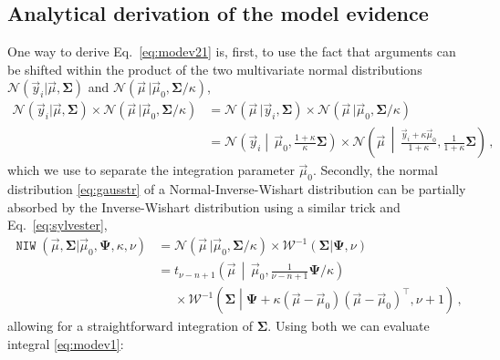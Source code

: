 \documentclass{article}
\begin{document}
\subsection{Analytical derivation of the model evidence}
\label{sec:appendix_derivmodev}
One way to derive Eq.~\eqref{eq:modev21} is, first, to use the fact that arguments can be shifted within the product of the two multivariate normal distributions $\mathcal{N}(\vec{y}_i | \vec{\mu}, \bm{\Sigma})$ and $\mathcal{N}(\vec{\mu}\, | \vec{\mu}_0, \bm{\Sigma} / \kappa)$,
\begin{align}
    \mathcal{N}(\vec{y}_i | \vec{\mu}, \bm{\Sigma}) \times \mathcal{N}(\vec{\mu}\, | \vec{\mu}_0, \bm{\Sigma} / \kappa)
    &= \mathcal{N}(\vec{\mu}\, | \vec{y}_i, \bm{\Sigma}) \times \mathcal{N}(\vec{\mu}\, | \vec{\mu}_0, \bm{\Sigma} / \kappa) \nonumber \\
    &= \mathcal{N}\! \left(\vec{y}_i \middle|\, \vec{\mu}_0, \frac{1 + \kappa}{\kappa} \bm{\Sigma} \right) \times \mathcal{N}\! \left(\vec{\mu} \,\middle|\, \frac{\vec{y}_i + \kappa \vec{\mu}_0}{1 + \kappa}, \frac{1}{1 + \kappa} \bm{\Sigma} \right) \,, \label{eq:trick1}
\end{align}
which we use to separate the integration parameter $\vec{\mu}_0$.
Secondly, the normal distribution \eqref{eq:gausstr} of a Normal-Inverse-Wishart distribution can be partially absorbed by the Inverse-Wishart distribution using a similar trick and Eq.~\eqref{eq:sylvester},
\begin{align}
    \operatorname{\texttt{NIW}} (\vec{\mu}, \bm{\Sigma} | \vec{\mu}_0, \bm{\Psi}, \kappa, \nu)
    &= \mathcal{N}(\vec{\mu}\, | \vec{\mu}_0, \bm{\Sigma} / \kappa) \times \mathcal{W}^{-1}(\bm{\Sigma} | \bm{\Psi}, \nu) \nonumber \\
    &= t_{\nu - n + 1}\!\left(\vec{\mu} \, \middle| \, \vec{\mu}_0, \frac{1}{\nu - n + 1} \bm{\Psi} / \kappa \right) \nonumber \\
    &\phantom{=} \times \mathcal{W}^{-1} \left( \bm{\Sigma} \middle| \bm{\Psi} + \kappa (\vec{\mu} - \vec{\mu}_0) (\vec{\mu} - \vec{\mu}_0)^\top, \nu + 1 \right) \,, \label{eq:trick2}
\end{align}
allowing for a straightforward integration of $\bm{\Sigma}$.
Using both we can evaluate integral \eqref{eq:modev1}:
\end{document}
